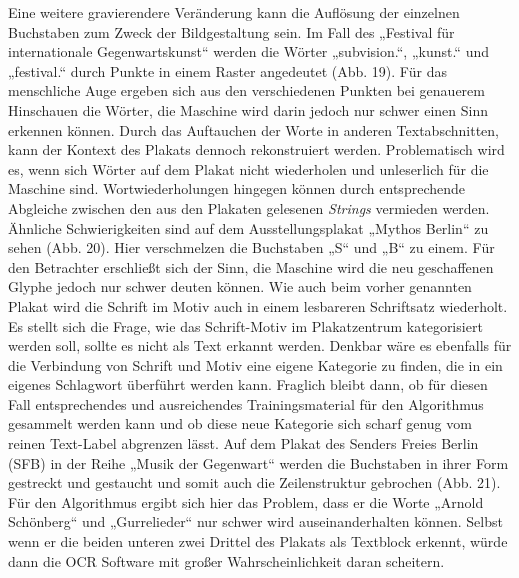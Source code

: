 \documentclass[a4paper,12pt,ngerman]{article}
\begin{document}
Eine weitere gravierendere Veränderung kann die Auflösung der einzelnen Buchstaben zum Zweck der Bildgestaltung sein. Im Fall des „Festival für internationale Gegenwartskunst“ werden die Wörter „subvision.“, „kunst.“ und „festival.“ durch Punkte in einem Raster angedeutet (Abb. 19). Für das menschliche Auge ergeben sich aus den verschiedenen Punkten bei genauerem Hinschauen die Wörter, die Maschine wird darin jedoch nur schwer einen Sinn erkennen können. Durch das Auftauchen der Worte in anderen Textabschnitten, kann der Kontext des Plakats dennoch rekonstruiert werden. Problematisch wird es, wenn sich Wörter auf dem Plakat nicht wiederholen und unleserlich für die Maschine sind. Wortwiederholungen hingegen können durch entsprechende Abgleiche zwischen den aus den Plakaten gelesenen \textit{Strings} vermieden werden. Ähnliche Schwierigkeiten sind auf dem Ausstellungsplakat „Mythos Berlin“ zu sehen (Abb. 20). Hier verschmelzen die Buchstaben „S“ und „B“ zu einem. Für den Betrachter erschließt sich der Sinn, die Maschine wird die neu geschaffenen Glyphe jedoch nur schwer deuten können. Wie auch beim vorher genannten Plakat wird die Schrift im Motiv auch in einem lesbareren Schriftsatz wiederholt. Es stellt sich die Frage, wie das Schrift-Motiv im Plakatzentrum kategorisiert werden soll, sollte es nicht als Text erkannt werden. Denkbar wäre es ebenfalls für die Verbindung von Schrift und Motiv eine eigene Kategorie zu finden, die in ein eigenes Schlagwort überführt werden kann. Fraglich bleibt dann, ob für diesen Fall entsprechendes und ausreichendes Trainingsmaterial für den Algorithmus gesammelt werden kann und ob diese neue Kategorie sich scharf genug vom reinen Text-Label abgrenzen lässt. Auf dem Plakat des Senders Freies Berlin (SFB) in der Reihe „Musik der Gegenwart“ werden die Buchstaben in ihrer Form gestreckt und gestaucht und somit auch die Zeilenstruktur gebrochen (Abb. 21). Für den Algorithmus ergibt sich hier das Problem, dass er die Worte „Arnold Schönberg“ und „Gurrelieder“ nur schwer wird auseinanderhalten können. Selbst wenn er die beiden unteren zwei Drittel des Plakats als Textblock erkennt, würde dann die OCR Software mit großer Wahrscheinlichkeit daran scheitern. \\
\end{document}
